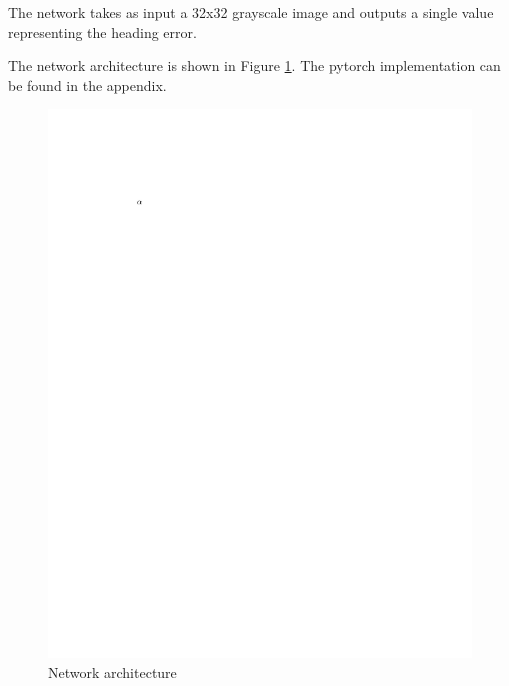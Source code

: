 \documentclass[a4paper,12pt,sort&compress]{article}
\begin{document}
    The network takes as input a 32x32 grayscale image and outputs a single value representing the heading
    error. 

    The network architecture is shown in Figure \ref{fig:network_architecture}. The pytorch
    implementation can be found in the appendix.

    \begin{figure}
        \centering
        \includegraphics[width=0.6\linewidth]{a.pdf}
        \caption{Network architecture}
        \label{fig:network_architecture}
    \end{figure}
\end{document}
